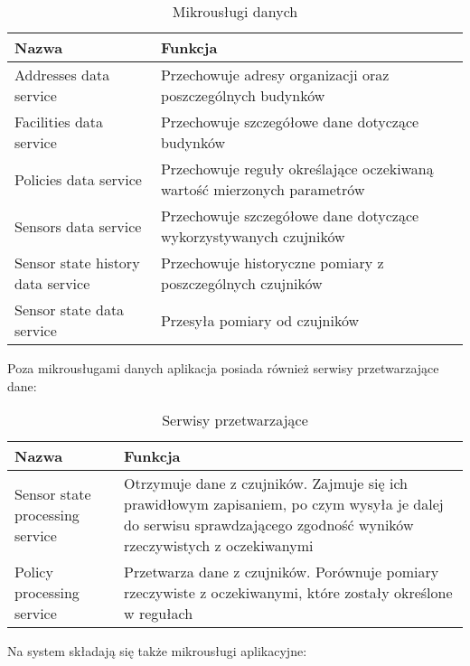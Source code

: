     \begin{xltabular}{1\textwidth} { 
        | >{\raggedright\arraybackslash}X        
        | >{\raggedleft\arraybackslash}X | }
        \caption{Mikrousługi danych} \label{tab:mikrouslugi-danych} \\
        \hline
       Nazwa & Funkcja \\
       \hline
       Addresses data service & 
       Przechowuje adresy organizacji oraz poszczególnych budynków \\
       \hline
       Facilities data service &
       Przechowuje szczegółowe dane dotyczące budynków \\
       \hline
       Policies data service & 
       Przechowuje reguły określające oczekiwaną wartość mierzonych parametrów \\
       \hline
       Sensors data service &
       Przechowuje szczegółowe dane dotyczące wykorzystywanych czujników \\
       \hline
       Sensor state history data service &
       Przechowuje historyczne pomiary z poszczególnych czujników \\
       \hline
       Sensor state data service &
       Przesyła pomiary od czujników \\
       \hline
    \end{xltabular}

Poza mikrousługami danych aplikacja posiada również serwisy przetwarzające dane:

    \begin{xltabular}{1\textwidth} { 
        | >{\raggedright\arraybackslash}X        
        | >{\raggedleft\arraybackslash}X | }
        \caption{Serwisy przetwarzające} \label{tab:serwisy-przetwarzajace} \\
        \hline
       Nazwa & Funkcja \\
       \hline
       Sensor state processing service & 
       Otrzymuje dane z czujników. Zajmuje się ich prawidłowym zapisaniem, po czym wysyła 
       je dalej do serwisu sprawdzającego zgodność wyników rzeczywistych z oczekiwanymi \\
       \hline
       Policy processing service &
       Przetwarza dane z czujników. Porównuje pomiary rzeczywiste z oczekiwanymi, które 
       zostały określone w regułach \\
       \hline
    \end{xltabular}

Na system składają się także mikrousługi aplikacyjne:

